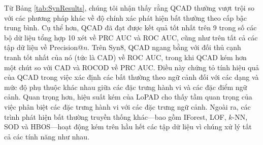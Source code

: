 Từ Bảng \ref{tab:SynResults}, chúng tôi nhận thấy rằng QCAD thường vượt trội so với các phương pháp khác về độ chính xác phát hiện bất thường theo cấp bậc trung bình. Cụ thể hơn, QCAD đã đạt được kết quả tốt nhất trên 9 trong số các bộ dữ liệu tổng hợp 10 xét về PRC AUC và ROC AUC, cũng như trên tất cả các tập dữ liệu về Precision@$n$. Trên Syn8, QCAD ngang bằng với đối thủ cạnh tranh tốt nhất của nó (tức là CAD) về ROC AUC, trong khi QCAD kém hơn một chút so với CAD và ROCOD về PRC AUC. Điều này chứng tỏ tính hiệu quả của QCAD trong việc xác định các bất thường theo ngữ cảnh đối với các dạng và mức độ phụ thuộc khác nhau giữa các đặc trưng hành vi và các đặc điểm ngữ cảnh. Quan trọng hơn, hiệu suất kém của LoPAD cho thấy tầm quan trọng của việc phân biệt các đặc trưng hành vi với các đặc trưng ngữ cảnh. Ngoài ra, các trình phát hiện bất thường truyền thống khác---bao gồm IForest, LOF, $k$-NN, SOD và HBOS---hoạt động kém trên hầu hết các tập dữ liệu vì chúng xử lý tất cả các tính năng như nhau.

